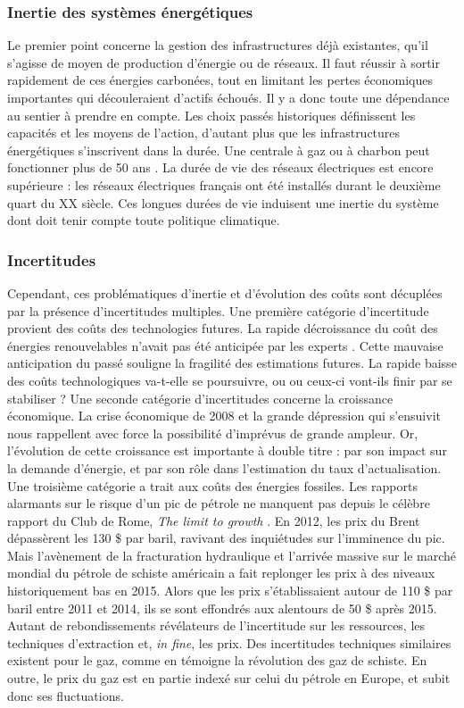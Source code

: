 \subsubsection{Inertie des systèmes énergétiques}
Le premier point concerne la gestion des infrastructures déjà existantes, qu’il s’agisse de moyen de production d’énergie ou de réseaux. Il faut réussir à sortir rapidement de ces énergies carbonées, tout en limitant les pertes économiques importantes qui découleraient d’actifs échoués. Il y a donc toute une dépendance au sentier à prendre en compte. Les choix passés historiques définissent les capacités et les moyens de l’action, d’autant plus que les infrastructures énergétiques s’inscrivent dans la durée. Une centrale à gaz ou à charbon peut fonctionner plus de 50 ans \citep{IEA2005}. La durée de vie des réseaux électriques est encore supérieure : les réseaux électriques français ont été installés durant le deuxième quart du XX siècle. Ces longues durées de vie induisent une inertie du système dont doit tenir compte toute politique climatique.

\subsubsection{Incertitudes}
Cependant, ces problématiques d’inertie et d'évolution des coûts sont décuplées par la présence d’incertitudes multiples.
Une première catégorie d’incertitude provient des coûts des technologies futures. La rapide décroissance du coût des énergies renouvelables n’avait pas été anticipée par les experts \citep{Metayer2015}. Cette mauvaise anticipation du passé souligne la fragilité des estimations futures. La rapide baisse des coûts technologiques va-t-elle se poursuivre, ou ou ceux-ci vont-ils finir par se stabiliser ? 
Une seconde catégorie d’incertitudes concerne la croissance économique. La crise économique de 2008 et la grande dépression qui s’ensuivit nous rappellent avec force la possibilité d'imprévus de grande ampleur. Or, l’évolution de cette croissance est importante à double titre : par son impact sur la demande d’énergie, et par son rôle dans l’estimation du taux d’actualisation. 
Une troisième catégorie a trait aux coûts des énergies fossiles. Les rapports alarmants sur le risque d’un pic de pétrole ne manquent pas depuis le célèbre rapport du Club de Rome, \textit{The limit to growth} \citep{Meadows1972}. En 2012, les prix du Brent dépassèrent les 130 \$ par baril, ravivant des inquiétudes sur l’imminence du pic. Mais l’avènement de la fracturation hydraulique et l’arrivée massive sur le marché mondial du pétrole de schiste américain a fait replonger les prix à des niveaux historiquement bas en 2015. Alors que les prix s’établissaient autour de 110 \$ par baril entre 2011 et 2014, ils se sont effondrés aux alentours de 50 \$ après 2015. Autant de rebondissements révélateurs de l’incertitude sur les ressources, les techniques d’extraction et, \textit{in fine}, les prix. 
Des incertitudes techniques similaires existent pour le gaz, comme en témoigne la révolution des gaz de schiste. En outre, le prix du gaz est en partie indexé sur celui du pétrole en Europe, et subit donc ses fluctuations. 

